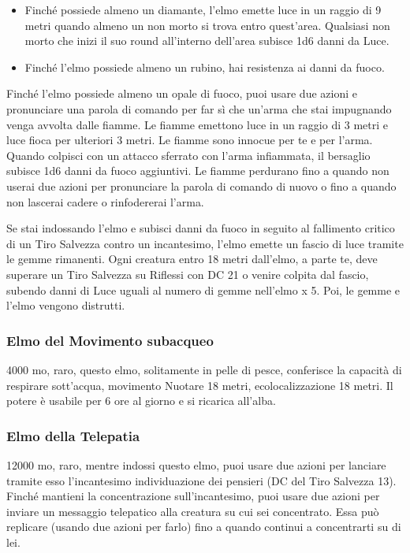 \begin{multicols}{2}
\begin{itemize}
\item
Finché possiede almeno un diamante, l'elmo emette luce in un raggio di 9 metri quando almeno un non morto si trova entro quest'area. Qualsiasi non morto che inizi il suo round all'interno dell'area subisce 1d6 danni da Luce.

\item
Finché l'elmo possiede almeno un rubino, hai resistenza ai danni da fuoco.
\end{itemize}

\medskip

Finché l'elmo possiede almeno un opale di fuoco, puoi usare due azioni e pronunciare una parola di comando per far sì che un'arma che stai impugnando venga avvolta dalle fiamme. Le fiamme emettono luce in un raggio di 3 metri e luce fioca per ulteriori 3 metri. Le fiamme sono innocue per te e per l'arma. Quando colpisci con un attacco sferrato con l'arma infiammata, il bersaglio subisce 1d6 danni da fuoco aggiuntivi. Le fiamme perdurano fino a quando non userai due azioni per pronunciare la parola di comando di nuovo o fino a quando non lascerai cadere o rinfodererai l'arma.

Se stai indossando l'elmo e subisci danni da fuoco in seguito al fallimento critico di un Tiro Salvezza contro un incantesimo, l'elmo emette un fascio di luce tramite le gemme rimanenti. Ogni creatura entro 18 metri dall'elmo, a parte te, deve superare un Tiro Salvezza su Riflessi con DC 21 o venire colpita dal fascio, subendo danni di Luce uguali al numero di gemme nell'elmo x 5. Poi, le gemme e l'elmo vengono distrutti.

\subsubsection*{Elmo del Movimento subacqueo}
4000 mo, raro, questo elmo, solitamente in pelle di pesce, conferisce la capacità di respirare sott'acqua, movimento Nuotare 18 metri, ecolocalizzazione 18 metri. Il potere è usabile per 6 ore al giorno e si ricarica all'alba.

\subsubsection*{Elmo della Telepatia}
12000 mo, raro, mentre indossi questo elmo, puoi usare due azioni per lanciare tramite esso l'incantesimo individuazione dei pensieri (DC del Tiro Salvezza 13). Finché mantieni la concentrazione sull'incantesimo, puoi usare due azioni per inviare un messaggio telepatico alla creatura su cui sei concentrato. Essa può replicare (usando due azioni per farlo) fino a quando continui a concentrarti su di lei.


\end{multicols}
